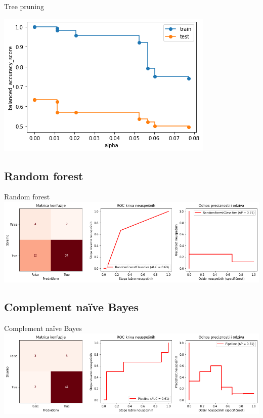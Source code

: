 \documentclass[hyperref={bookmarks=false}]{beamer}
\begin{document}
\begin{frame}{Tree pruning}
\begin{center}
    \includegraphics[width=.75\textwidth]{../slike/pruning.png}
\end{center}
\end{frame}

\subsection{Random forest}
\begin{frame}{Random forest}
\includegraphics[width=\textwidth]{../slike/forest.png}
\end{frame}

\subsection{Complement naïve Bayes}
\begin{frame}{Complement naïve Bayes}
\includegraphics[width=\textwidth]{../slike/cnb.png}
\end{frame}
\end{document}

